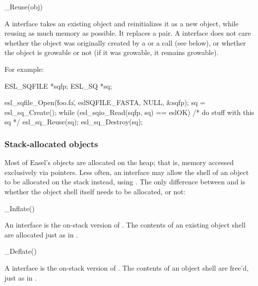 \begin{sreapi}
\hypertarget{ifc:Reuse}
{\item[\_Reuse(obj)]}

A  interface takes an existing object and
reinitializes it as a new object, while reusing as much memory as
possible. It replaces a  pair. A
 interface does not care whether the object was
originally created by a  or a 
call (see below), or whether the object is growable or not (if it was
growable, it remains growable).
\end{sreapi}

For example:

\begin{cchunk}
   ESL_SQFILE *sqfp;
   ESL_SQ     *sq;

   esl_sqfile_Open(\"foo.fa\", eslSQFILE_FASTA, NULL, &sqfp);
   sq = esl_sq_Create();
   while (esl_sqio_Read(sqfp, sq) == eslOK)
    {
       /* do stuff with this sq */
       esl_sq_Reuse(sq);
    }
   esl_sq_Destroy(sq);
\end{cchunk}


  \subsubsection{Stack-allocated objects}

Most of Easel's objects are allocated on the heap; that is,
 memory accessed exclusively via pointers. Less
often, an interface may allow the shell of an object to be allocated
on the stack instead, using .  The only
difference between  and
 is whether the object shell itself
needs to be allocated, or not:

\begin{sreapi}
\hypertarget{ifc:Inflate}
{\item[\_Inflate()]}

An  interface is the on-stack version of
. The contents of an existing object shell
are allocated just as in .

\hypertarget{ifc:Deflate}
{\item[\_Deflate()]}

A  interface is the on-stack version of
. The contents of an object shell are free'd,
just as in .
\end{sreapi}

